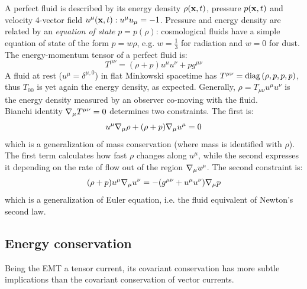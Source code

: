 A perfect fluid is described by its energy density $ \rho(\mathbf{x},t) $, pressure $ p(\mathbf{x},t) $ and velocity 4-vector field $ u^\mu(\mathbf{x},t) : u^\mu u_\mu = -1 $. Pressure and energy density are related by an \textit{equation of state} $ p = p(\rho) $: cosmological fluids have a simple equation of state of the form $ p = w \rho $, e.g. $ w = \frac{1}{3} $ for radiation and $ w = 0 $ for dust.
The energy-momentum tensor of a perfect fluid is:
\begin{equation}
  T^{\mu \nu} = (\rho + p) u^\mu u^\nu + p g^{\mu \nu}
  \label{eq:em-tens-fluid}
\end{equation}
A fluid at rest ($ u^\mu = \delta^{\mu,0} $) in flat Minkowski spacetime has $ T^{\mu \nu} = \operatorname{diag} \left( \rho, p, p, p \right) $, thus $ T_{00} $ is yet again the energy density, as expected. Generally, $ \rho = T_{\mu \nu} u^\mu u^\nu $ is the energy density measured by an observer co-moving with the fluid.\\
Bianchi identity $ \nabla_\mu T^{\mu \nu} = 0 $ determines two constraints. The first is:
\begin{equation}
  u^\mu \nabla_\mu \rho + (\rho + p) \nabla_\mu u^\mu = 0
\end{equation}
which is a generalization of mass conservation (where mass is identified with $ \rho $). The first term calculates how fast $ \rho $ changes along $ u^\mu $, while the second expresses it depending on the rate of flow out of the region $ \nabla_\mu u^\mu $. The second constraint is:
\begin{equation}
  (\rho + p) u^\mu \nabla_\mu u^\nu = - (g^{\mu \nu} + u^\mu u^\nu) \nabla_\mu p
  \label{eq:euler-eq}
\end{equation}
which is a generalization of Euler equation, i.e. the fluid equivalent of Newton's second law.

\subsection{Energy conservation}
\label{ssec:energy-conservation}

Being the EMT a tensor current, its covariant conservation has more subtle implications than the covariant conservation of vector currents.

